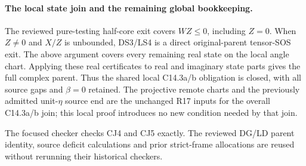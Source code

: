 \paragraph{The local state join and the remaining global bookkeeping.}
The reviewed pure-testing half-core exit covers $WZ\le0$, including
$Z=0$.  When $Z\ne0$ and $X/Z$ is unbounded, DS3/LS4 is a direct
original-parent tensor-SOS exit.  The above argument covers every
remaining real state on the local angle chart.  Applying these real
certificates to real and imaginary state parts gives the full complex
parent.  Thus the shared local C14.3a/b obligation is closed, with
all source gaps and $\beta=0$ retained.  The projective remote charts
and the previously admitted unit-$\eta$ source end are the unchanged
R17 inputs for the overall C14.3a/b join; this local proof introduces
no new condition needed by that join.

The focused checker 
checks CJ4 and CJ5 exactly.  The reviewed DG/LD parent identity,
source deficit calculations and prior strict-frame allocations are
reused without rerunning their historical checkers.
